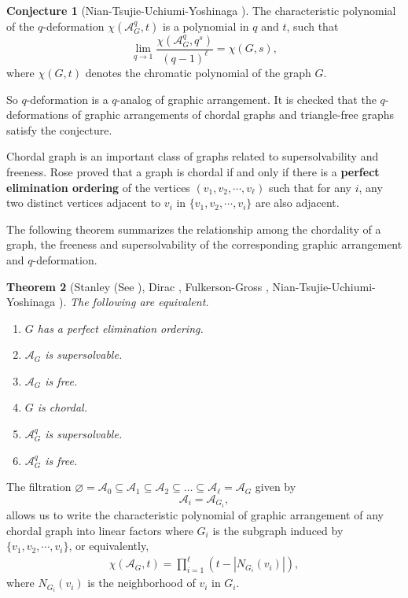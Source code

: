 \documentclass[12pt]{article}
\theoremstyle{plain}%
\newtheorem{theorem}{Theorem}[section]
\theoremstyle{definition}
\newtheorem{conjecture}[theorem]{Conjecture}
\begin{document}
\begin{conjecture}[Nian-Tsujie-Uchiumi-Yoshinaga \cite{nian2024qdeformationchromaticpolynomialsgraphical}]\label{q-deformation conjceture}
The characteristic polynomial of the $q$-deformation $\chi(\mathcal{A}_G^q,t)$ is a polynomial in $q$ and $t$, such that
    \[
\lim_{q\to 1}\frac{\chi(\mathcal{A}_G^q, q^s)}{(q-1)^\ell}
=\chi(G, s),
\]
where $\chi(G, t)$ denotes the chromatic polynomial of the graph $G$.
\end{conjecture}

So $q$-deformation is a $q$-analog of graphic arrangement. It is checked that the $q$-deformations of graphic arrangements of chordal graphs and triangle-free graphs satisfy the conjecture.

Chordal graph is an important class of graphs related to supersolvability and freeness. Rose\cite{rose1970triangulated} proved that a graph is chordal if and only if there is a \textbf{perfect elimination ordering} of the vertices $(v_1,v_2,\cdots,v_\ell)$ such that for any $i$, any two distinct vertices adjacent to $v_i$ in $\{v_1,v_2,\cdots,v_i\}$ are also adjacent.

The following theorem summarizes the relationship among the chordality of a graph, the freeness and supersolvability of the corresponding graphic arrangement and $q$-deformation.
\begin{theorem}[Stanley (See {\cite[Theorem 3.3]{edelman1994free-mz}}), Dirac \cite{dirac1961rigid-aadmsduh}, Fulkerson-Gross \cite{fulkerson1965incidence-pjom}, Nian-Tsujie-Uchiumi-Yoshinaga \cite{nian2024qdeformationchromaticpolynomialsgraphical}]\label{graphical arrangement freeness}
The following are equivalent. 
\begin{enumerate}[label=(\arabic*)]
\item\label{PEO} $G$ has a perfect elimination ordering. 
\item $\mathcal{A}_{G}$ is supersolvable. 
\item $\mathcal{A}_{G}$ is free. 
\item\label{chordal} $G$ is chordal. 
\item\label{q SS} $\mathcal{A}_{G}^{q}$ is supersolvable. 
\item\label{q free} $\mathcal{A}_{G}^{q}$ is free. 
\end{enumerate}
\end{theorem}

The filtration $\varnothing=\mathcal{A}_{0} \subseteq \mathcal{A}_{1} \subseteq \mathcal{A}_{2} \subseteq \dots \subseteq \mathcal{A}_{\ell} = \mathcal{A}_G$ given by 
$$\mathcal{A}_{i}=\mathcal{A}_{G_i},$$
allows us to write the characteristic polynomial of graphic arrangement of any chordal graph into linear factors where $G_i$ is the subgraph induced by $\{v_1,v_2,\cdots,v_i\}$, or equivalently,
\begin{align*}
\chi(\mathcal{A}_{G}, t) = \prod_{i=1}^{\ell}(t-|N_{G_{i}}(v_{i})|), 
\end{align*}
where $N_{G_{i}}(v_{i})$ is the neighborhood of $v_{i}$ in $G_{i}$. 
\end{document}
